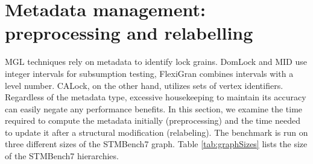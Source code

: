 




\section{Metadata management: preprocessing and relabelling} \label
{benchmark:labellingAndRelabelling}
 
MGL techniques rely on metadata to identify lock grains. DomLock and MID use integer intervals for subsumption testing, FlexiGran combines intervals with a level number. CALock, on the other hand, utilizes sets of vertex identifiers. Regardless of the metadata type, excessive housekeeping to maintain its accuracy can easily negate any performance benefits. In this section, we examine the time required to compute the metadata initially (preprocessing) and the time needed to update it after a structural modification (relabeling). The benchmark is run on three different sizes of the STMBench7 graph. Table \ref{tab:graphSizes} lists the size of the STMBench7 hierarchies.

